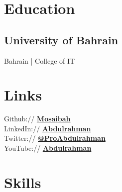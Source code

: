 \documentclass[]{main}
\begin{document}
%
%
\lastupdated

%
%


%
%

\begin{minipage}[t]{0.33\textwidth} 


\section{Education} 

\subsection{University of Bahrain}
Bahrain | College of IT
\sectionsep


\section{Links} 
Github:// \href{https://github.com/mosaibah}{\bf Mosaibah} \\
LinkedIn://  \href{https://www.linkedin.com/in/Abdulrahman-Mosaibah}{\bf Abdulrahman} \\
Twitter://  \href{https://twitter.com/proAbdulrahmna}{\bf @ProAbdulrahman} \\
YouTube://  \href{https://www.youtube.com/@abdulrahman-mosaibah}{\bf Abdulrahman} \\


\section{Skills}

\end{minipage}
\end{document}
